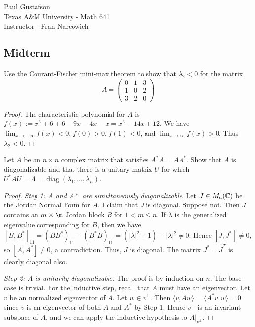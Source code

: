 \documentclass{article}
\DeclareMathOperator{\diag}{diag}
\begin{document}
\noindent Paul Gustafson\\
\noindent Texas A\&M University - Math 641\\ 
\noindent Instructor - Fran Narcowich

\subsection*{Midterm}

 Use the Courant-Fischer mini-max theorem to show that $\lambda_2 < 0$ for the matrix 
$$A = \begin{pmatrix} 
   0 & 1 & 3
\\ 1 & 0 & 2
\\ 3 & 2 & 0
\end{pmatrix}$$

\begin{proof}
The characteristic polynomial for $A$ is $f(x) := x^3 +6 + 6 - 9x -4x - x = x^3 - 14x + 12$.  We have $\lim_{x\to -\infty} f(x) < 0$, $f(0) > 0$, $f(1) < 0$, and $\lim_{x \to \infty} f(x) > 0$. Thus $\lambda_2 < 0$.
\end{proof}

 Let $A$ be an $n \times n$ complex matrix that satisfies $A^* A = A A^*$. Show that $A$ is diagonalizable and that there is a unitary matrix $U$ for which $U^*AU = \Lambda = \diag(\lambda_1, \ldots, \lambda_n)$.

\begin{proof}
\emph{Step 1: $A$ and $A*$ are simultaneously diagonalizable}.  Let $J \in M_n(\mathbb{C})$ be the Jordan Normal Form for $A$.  I claim that $J$ is diagonal. Suppose not. Then $J$ contains an $m \times \m$ Jordan block $B$ for $ 1< m \le n$.  If $\lambda$ is the generalized eigenvalue corresponding for $B$, then we have $[B, B^*]_{11} = (B B^*)_{11} - (B^*B)_{11} = (|\lambda|^2 + 1) - |\lambda|^2 \neq 0$.  Hence $[J, J^*] \neq 0$, so $[A, A^*] \neq 0$, a contradiction. Thus, $J$ is diagonal. The matrix $J^* = \overline{J}^T$ is clearly diagonal also.

\emph{Step 2: $A$ is unitarily diagonalizable.}  The proof is by induction on $n$. The base case is trivial. For the inductive step, recall that $A$ must have an eigenvector.  Let $v$ be an normalized eigenvector of $A$.  Let $w \in v^\perp$.  Then $\langle v, Aw \rangle = \langle A^*v , w \rangle = 0$ since $v$ is an eigenvector of both $A$ and $A^*$ by Step 1.  Hence $v^\perp$ is an invariant subspace of $A$, and we can apply the inductive hypothesis to $A \vert_{v^\perp}$.  
\end{proof}
\end{document}
